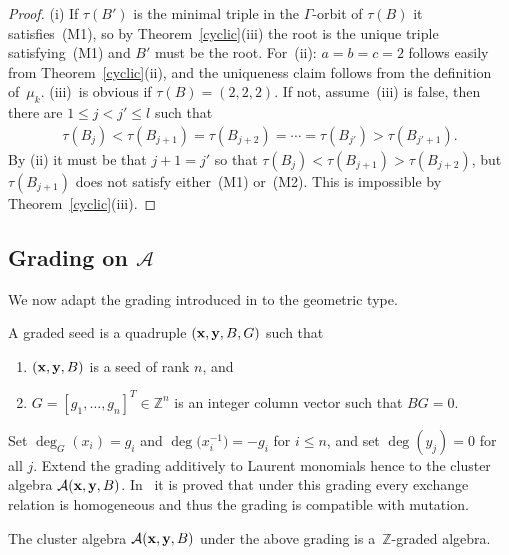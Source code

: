 \begin{proof}
(i) If $\tau(B')$ is the minimal triple in the $\Gamma$-orbit of $\tau(B)$ it satisf\/ies~(M1), so by Theo\-rem~\ref{cyclic}(iii) the root is the unique triple satisfying~(M1) and $B'$ must be the root.
For~(ii): $a=b=c=2$ follows easily from Theorem~\ref{cyclic}(ii), and the uniqueness claim follows from the def\/inition of~$\mu_k$.
 (iii)~is obvious if  $\tau(B)=(2,2,2)$. If not, assume~(iii) is false, then there are $1\le j<j'\le l$ such that
 \begin{gather*}
 \tau(B_j)<\tau(B_{j+1})=\tau(B_{j+2})=\cdots=\tau(B_{j'})>\tau(B_{j'+1}).
 \end{gather*}
By (ii) it must be that $j+1=j'$ so that  $\tau(B_j)< \tau(B_{j+1}) > \tau(B_{j+2})$, but $\tau(B_{j+1})$ does not satisfy either~(M1) or~(M2). This is impossible by Theorem~\ref{cyclic}(iii).
\end{proof}

\subsection[Grading on~$\mathcal{A}$]{Grading on $\boldsymbol{\mathcal{A}}$}\label{section4.2}

We now adapt the grading introduced in \cite[Def\/inition 3.1]{G} to the geometric type.
\begin{Definition}
A graded seed is a quadruple $({\bf x},{\bf y},B,G)$ such that
\begin{enumerate}\itemsep=0pt
\item[(i)] $({\bf x},{\bf y},B)$ is a seed of rank $n$, and
\item[(ii)] $G=[g_1,\dots,g_n]^T\in \mathbb{Z}^n$ is an integer column vector such that $BG=0$.
\end{enumerate}
\end{Definition}

Set $\deg_G(x_i)=g_i$ and $\deg\big(x_i^{-1}\big)=-g_i$ for $i\le n$, and set $\deg(y_j)=0$ for all $j$. Extend the grading additively to Laurent monomials hence to the cluster algebra $\mathcal{A}({\bf x},{\bf y},B)$. In~\cite{G} it is proved that under this grading every exchange relation is homogeneous and thus the grading is compatible with mutation.

\begin{Theorem}
The cluster algebra $\mathcal{A}({\bf x},{\bf y},B)$ under the above grading is a~$\mathbb{Z}$-graded algebra.
\end{Theorem}

